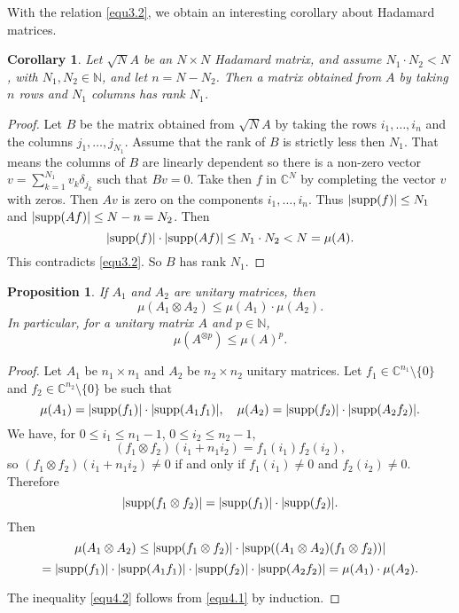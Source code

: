 \documentclass[11pt]{amsart}
\newtheorem{corollary}[theorem]{Corollary}
\newtheorem{proposition}[theorem]{Proposition}
\theoremstyle{definition}
\theoremstyle{remark}
\numberwithin{equation}{section}
\newcommand{\bc}{\mathbb{C}}
\newcommand{\bn}{\mathbb{N}}
\newcommand{\suport}{\textup{supp}}
\begin{document}
With the relation \eqref{equ3.2}, we obtain an interesting corollary about Hadamard matrices.

\begin{corollary}\label{coru3.2}
Let $\sqrt NA$ be an $N\times N$ Hadamard matrix, and assume $N_1\cdot N_2<N$, with $N_1,N_2\in\bn$, and let $n=N-N_2$. Then a matrix obtained from $A$ by taking $n$ rows and $N_1$ columns has rank $N_1$.
\end{corollary}

\begin{proof}
Let $B$ be the matrix obtained from $\sqrt NA$ by taking the rows $i_1,\dots,i_n$ and the columns $j_1,\dots,j_{N_1}$. Assume that the rank of $B$ is strictly less then $N_1$. That means the columns of $B$ are linearly dependent so there is a non-zero vector $v=\sum_{k=1}^{N_1}v_k\delta_{j_k}$ such that $Bv=0$. Take then $f$ in $\bc^N$ by completing the vector $v$ with zeros. Then $Av$ is zero on the components $i_1,\dots, i_n$. Thus $|\suport(f)|\leq N_1$ and $|\suport (Af)|\leq N-n=N_2$. Then
$$|\suport(f)|\cdot|\suport(Af)|\leq N_1\cdot N_2< N=\mu(A).$$
This contradicts \eqref{equ3.2}. So $B$ has rank $N_1$.
\end{proof}

\begin{proposition}\label{pru4}
If $A_1$ and $A_2$ are unitary matrices, then
\begin{equation}
\mu(A_1\otimes A_2)\leq \mu(A_1)\cdot\mu(A_2).
\label{equ4.1}
\end{equation}
In particular, for a unitary matrix $A$ and $p\in\bn$,
\begin{equation}
\mu(A^{\otimes p})\leq \mu(A)^p.
\label{equ4.2}
\end{equation}
\end{proposition}

\begin{proof}
Let $A_1$ be $n_1\times n_1$ and $A_2$ be $n_2\times n_2$ unitary matrices. Let $f_1\in\bc^{n_1}\setminus \{0\}$ and $f_2\in \bc^{n_2}\setminus\{0\}$ be such that
$$\mu(A_1)=|\suport(f_1)|\cdot|\suport(A_1f_1)|,\quad \mu(A_2)=|\suport(f_2)|\cdot|\suport(A_2f_2)|.$$
We have, for $0\leq i_1\leq n_1-1$, $0\leq i_2\leq n_2-1$,
$$(f_1\otimes f_2)(i_1+n_1i_2)=f_1(i_1)f_2(i_2),$$
so $(f_1\otimes f_2)(i_1+n_1i_2)\neq 0$ if and only if $f_1(i_1)\neq 0$ and $f_2(i_2)\neq 0$. Therefore
$$|\suport (f_1\otimes f_2)|=|\suport(f_1)|\cdot|\suport(f_2)|.$$
Then
$$\mu(A_1\otimes A_2)\leq |\suport(f_1\otimes f_2)|\cdot |\suport( (A_1\otimes A_2)(f_1\otimes f_2))|$$
$$=|\suport(f_1)|\cdot |\suport(A_1f_1)|\cdot |\suport(f_2)|\cdot |\suport(A_2f_2)|=\mu(A_1)\cdot\mu(A_2).$$

The inequality \eqref{equ4.2} follows from \eqref{equ4.1} by induction.
\end{proof}
\end{document}
